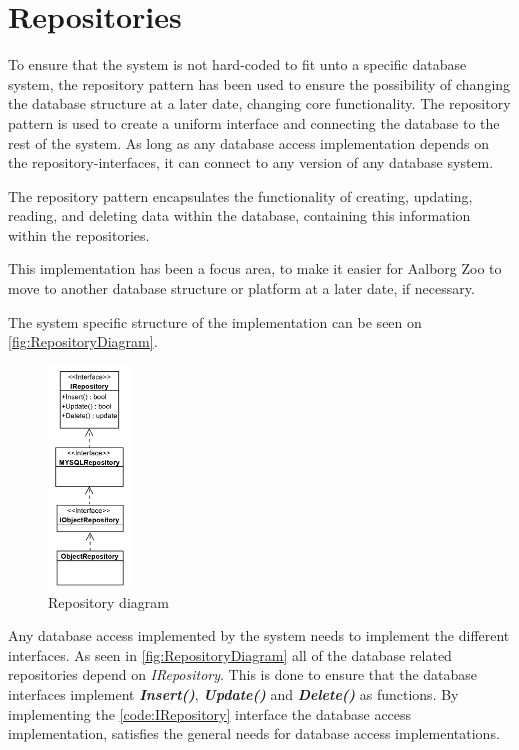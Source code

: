 \section{Repositories} \label{sc:RepositoryPatern}
To ensure that the system is not hard-coded to fit unto a specific database system, the repository pattern \citep{RepositoryPattern} has been used to ensure the possibility of changing the database structure at a later date, changing core functionality. The repository pattern is used to create a uniform interface and connecting the database to the rest of the system. As long as any database access implementation depends on the repository-interfaces, it can connect to any version of any database system.
\par
The repository pattern encapsulates the functionality of creating, updating, reading, and deleting data within the database, containing this information within the repositories.
\par
This implementation has been a focus area, to make it easier for Aalborg Zoo to move to another database structure or platform at a later date, if necessary. 
\par
The system specific structure of the implementation can be seen on \autoref{fig:RepositoryDiagram}.

\begin{figure}[H]
    \centering
    \includegraphics[width=0.2\textwidth]{figures/Implementation/GenericRepositoryStructure.PNG}
    \caption{Repository diagram}
    \label{fig:RepositoryDiagram}
\end{figure}

Any database access implemented by the system needs to implement the different interfaces. As seen in \autoref{fig:RepositoryDiagram} all of the database related repositories depend on \textit{IRepository}. This is done to ensure that the database interfaces implement \textbf{\textit{Insert()}}, \textbf{\textit{Update()}} and \textbf{\textit{Delete()}} as functions. By implementing the \autoref{code:IRepository} interface the database access implementation, satisfies the general needs for database access implementations.

